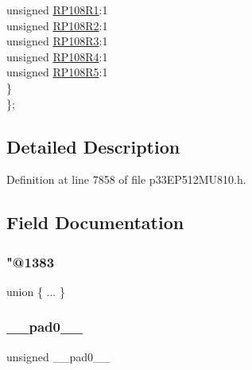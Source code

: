 \begin{DoxyCompactItemize}
\begin{tabbing}
\>\>unsigned \hyperlink{structtag_r_p_o_r11_b_i_t_s_a0a193bc4d47011f44f4014ed3385e1a2}{RP108R1}:1\\
\>\>unsigned \hyperlink{structtag_r_p_o_r11_b_i_t_s_a73809f6201791040d88642245c25afe9}{RP108R2}:1\\
\>\>unsigned \hyperlink{structtag_r_p_o_r11_b_i_t_s_a138aec531d59b764a94cfa230b84c83a}{RP108R3}:1\\
\>\>unsigned \hyperlink{structtag_r_p_o_r11_b_i_t_s_abc97389fb9858bb8b533b4eb8ca91122}{RP108R4}:1\\
\>\>unsigned \hyperlink{structtag_r_p_o_r11_b_i_t_s_a0472d693e3ec668557f970eb069ad94f}{RP108R5}:1\\
\>\} \\
\}; \\

\end{tabbing}\end{DoxyCompactItemize}


\subsection{Detailed Description}


Definition at line 7858 of file p33\+E\+P512\+M\+U810.\+h.



\subsection{Field Documentation}
\mbox{\label{structtag_r_p_o_r11_b_i_t_s_a28c09bbd9a342882846a393102d5430d}} 
\subsubsection{\texorpdfstring{"@1383}{@1383}}
{\footnotesize\ttfamily union \{ ... \} }

\mbox{\label{structtag_r_p_o_r11_b_i_t_s_adf71f3d8410c1f1dbbc96680a92c49af}} 
\subsubsection{\texorpdfstring{\+\_\+\+\_\+pad0\+\_\+\+\_\+}{\_\_pad0\_\_}}
{\footnotesize\ttfamily unsigned \+\_\+\+\_\+pad0\+\_\+\+\_\+}



